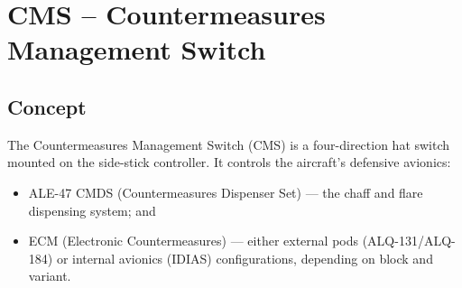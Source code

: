 \documentclass[11pt, a4paper, twoside]{report}
\begin{document}


\chapter{CMS – Countermeasures Management Switch}
\label{chap:C5}

\section{Concept}
\label{sec:C5-S1}

The Countermeasures Management Switch (CMS) is a four-direction hat switch mounted on the side-stick controller. It controls the aircraft's defensive avionics:

\begin{itemize}
  \item ALE-47 CMDS (Countermeasures Dispenser Set) --- the chaff and flare dispensing system; and
  \item ECM (Electronic Countermeasures) --- either external pods (ALQ-131/ALQ-184) or internal avionics (IDIAS) configurations, depending on block and variant.
\end{itemize}
\end{document}
